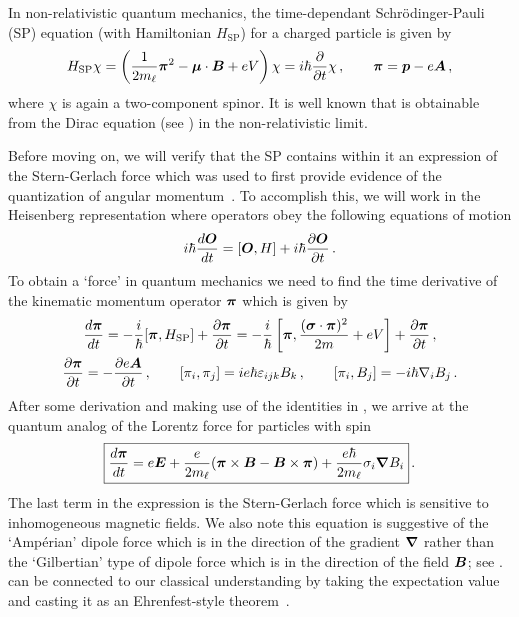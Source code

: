 In non-relativistic quantum mechanics, the time-dependant Schr{\"o}dinger-Pauli (SP) equation (with Hamiltonian $H_\mathrm{SP}$) for a charged particle is given by
\begin{gather}
	\label{sp:1}
    {H}_{\mathrm{SP}}\chi=\left(\frac{1}{2m_{\ell}}\boldsymbol{\pi}^{2}-\boldsymbol{\mu}\cdot\boldsymbol{B}+e{ V}\right)\chi=i\hbar\frac{\partial}{\partial t}\chi\,,\qquad
    \boldsymbol{\pi}=\boldsymbol{ p}-e{\boldsymbol{A}}\,,
\end{gather}
where $\chi$ is again a two-component spinor. It is well known that  is obtainable from the Dirac equation (see ) in the non-relativistic limit.

Before moving on, we will verify that the SP  contains within it an expression of the Stern-Gerlach force which was used to first provide evidence of the quantization of angular momentum~\citep{Gerlach:1922zz}. To accomplish this, we will work in the Heisenberg representation where operators obey the following equations of motion
\begin{align}
    \label{h:1}
    i\hbar\frac{d\boldsymbol{O}}{dt}=[\boldsymbol{O},H]+
    i\hbar\frac{\partial\boldsymbol{O}}{\partial t}\,.
\end{align}
To obtain a `force' in quantum mechanics we need to find the time derivative of the kinematic momentum operator $\boldsymbol{\pi}$ which is given by
\begin{gather}
    \label{h:2}
    \frac{d\boldsymbol{\pi}}{dt}=-\frac{i}{\hbar}[\boldsymbol{\pi},H_\mathrm{SP}]+\frac{\partial\boldsymbol{\pi}}{\partial t}=-\frac{i}{\hbar}\left[\boldsymbol{\pi},\frac{(\boldsymbol{\sigma}\cdot\boldsymbol{\pi})^{2}}{2m}+eV\right]+\frac{\partial\boldsymbol{\pi}}{\partial t}\,,\\
    \label{h:3}
    \frac{\partial\boldsymbol{\pi}}{\partial t} = -\frac{\partial e\boldsymbol{A}}{\partial t}\,,\qquad
    [\pi_{i},\pi_{j}]=ie\hbar\varepsilon_{ijk}B_{k}\,,\qquad
    [\pi_{i},B_{j}]=-i\hbar\nabla_{i}B_{j}\,.
\end{gather}
After some derivation and making use of the identities in , we arrive at the quantum analog of the Lorentz force for particles with spin
\begin{gather}
    \label{ehren:1}
    \boxed{\frac{d\boldsymbol{\pi}}{dt}=e\boldsymbol{E}+\frac{e}{2m_{\ell}}(\boldsymbol{\pi}\times\boldsymbol{B}-\boldsymbol{B}\times\boldsymbol{\pi})+\frac{e\hbar}{2m_{\ell}}\sigma_{i}\boldsymbol{\nabla}B_{i}}\,.
\end{gather}
The last term in the expression is the Stern-Gerlach force which is sensitive to inhomogeneous magnetic fields. We also note this equation is suggestive of the `Amp{\'e}rian' dipole force which is in the direction of the gradient $\boldsymbol{\nabla}$ rather than the `Gilbertian' type of dipole force which is in the direction of the field $\boldsymbol{B}$; see .  can be connected to our classical understanding by taking the expectation value and casting it as an Ehrenfest-style theorem~\citep{Ehrenfest:1927swx}.

